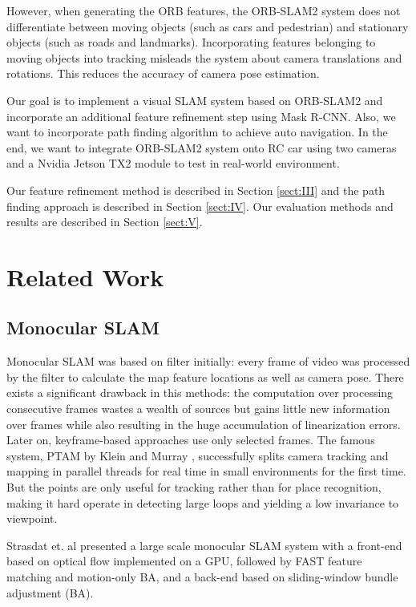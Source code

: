 \documentclass[letterpaper, 10 pt, conference]{IEEEtran}
\begin{document}
However, when generating the ORB features, the ORB-SLAM2 system does not 
differentiate between moving objects (such as cars and pedestrian) and 
stationary objects (such as roads and landmarks). Incorporating features 
belonging to moving objects into tracking misleads the system about camera 
translations and rotations. This reduces the accuracy of camera pose estimation.

Our goal is to implement a visual SLAM system based on ORB-SLAM2 and incorporate
an additional feature refinement step using Mask R-CNN. Also, we want to 
incorporate path finding algorithm to achieve auto navigation. In the end, we 
want to integrate ORB-SLAM2 system onto RC car using two cameras and a Nvidia 
Jetson TX2 module to test in real-world environment. 

Our feature refinement method is described in Section \ref{sect:III} and the 
path finding approach is described in Section \ref{sect:IV}. Our evaluation
methods and results are described in Section \ref{sect:V}. 

\section{Related Work} \label{sect:\thesection}
\subsection{Monocular SLAM} \label{sect:\thesubsection}
Monocular SLAM was based on filter initially: every frame of video was processed
by the filter to calculate the map feature locations as well as camera pose. 
There exists a significant drawback in this methods: the computation over 
processing consecutive frames wastes a wealth of sources but gains little new
information over frames while also resulting in the huge accumulation of 
linearization errors. Later on, keyframe-based approaches use only selected 
frames. The famous system, PTAM by Klein and Murray \cite{c3}, successfully 
splits camera tracking and mapping in parallel threads for real time in small 
environments for the first time. But the points are only useful for tracking 
rather than for place recognition, making it hard operate in detecting large 
loops and yielding a low invariance to viewpoint.

Strasdat et. al \cite{c4} presented a large scale monocular SLAM system with a 
front-end based on optical flow implemented on a GPU, followed by FAST feature 
matching and motion-only BA, and a back-end based on sliding-window bundle 
adjustment (BA). 
\end{document}

